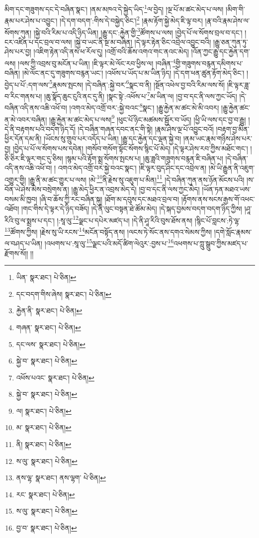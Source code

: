 མིག་དང་གཟུགས་དང་དེ་བཞིན་སྣང་། །ནམ་མཁའ་དེ་སྐྱེད་ཡིད་\footnote{ཡིན་  སྣར་ཐང་།  པེ་ཅིན། }ལ་བྱེད། །ལྔ་པོ་མ་ཚང་མེད་པ་ལས། །མིག་གི་རྣམ་པར་ཤེས་པ་འབྱུང་། །དེ་དག་བདག་:གིས་དེ་བསྐྱེད་ཅིང་།\footnote{དང་བདག་གིས་ཞེས།  སྣར་ཐང་།  པེ་ཅིན། } །རྣམ་རྟོག་སྐྱེ་མེད་ཇི་ལྟ་བར། །རྣ་བའི་རྣམ་ཤེས་ལ་སོགས་ཀུན། །སྐྱེ་བའི་རིམ་པ་འདི་ཉིད་ཡིན། །རྒྱུ་དང་:རྐྱེན་གྱི་\footnote{རྐྱེན་ནི་  སྣར་ཐང་།  པེ་ཅིན། }ཚོགས་པ་ལས། །བྱེད་པོ་ལ་སོགས་བྲལ་བ་དང་། །ངར་འཛིན་པ་དང་བྲལ་བ་ལས། །སྐྱེ་བ་ཡང་ནི་སྔ་མ་བཞིན། །དེ་ལྟར་རྟེན་ཅིང་འབྲེལ་འབྱུང་བའི། །རྒྱུ་ཅན་ཀུན་ཏུ་ཤེས་པར་བྱ། །འཇིག་རྟེན་འདི་ནས་ཕ་རོལ་དུ། །འགྲོ་བའི་ཆོས་འགའ་གང་ནའང་མེད། །འོན་ཀྱང་རྒྱུ་དང་རྐྱེན་དག་ལས། །ལས་ཀྱི་འབྲས་བུ་མངོན་པ་ཡིན། །ཇི་ལྟར་མེ་ལོང་རབ་ཕྱིས་ལ། །བཞིན་\footnote{གཞན་  སྣར་ཐང་།  པེ་ཅིན། }གྱི་གཟུགས་བརྙན་དམིགས་པ་བཞིན། །མེ་ལོང་ནང་དུ་གཟུགས་བརྙན་ཡང་། །འཕོས་པ་ཡོད་པ་མ་ཡིན་ཉིད། །དེ་དག་ཕན་ཚུན་རྟོག་མེད་ཅིང་། །བྱེད་པ་པོ་:དག་ལས་\footnote{དང་ལས་  སྣར་ཐང་།  པེ་ཅིན། }རྣམས་སྤངས། །དེ་བཞིན་:སྐྱེ་བར་\footnote{སྐྱེ་བ་  སྣར་ཐང་།  པེ་ཅིན། }སྣང་བ་ནི། །སྔོན་འཕེལ་བྱ་བའི་རིམ་ལས་སོ། །ཇི་ལྟར་ཟླ་བ་རིང་གནས་པ། །ཆུ་སྣོད་ཆུང་ངུའི་ནང་དུ་ནི། །སྣང་སྟེ་:འཕོས་པ་\footnote{འཕོས་པའང་  སྣར་ཐང་།  པེ་ཅིན། }མ་ཡིན་ལ། །བྱ་བ་དང་ནི་ལས་ཀྱང་ཡོད། །དེ་བཞིན་འདི་ནས་འཆི་འཕོ་བ། །འགའ་མེད་འགྲོ་བར་:སྐྱེ་བའང་\footnote{སྐྱེ་བ་  སྣར་ཐང་།  པེ་ཅིན། }སྣང་། །རྒྱུ་རྐྱེན་མ་ཚང་མེ་མི་འབར། །རྒྱུ་རྐྱེན་ཚང་ན་མེ་འབར་བཞིན། །རྒྱུ་རྐྱེན་མ་ཚང་མེད་པ་ལས།\footnote{ལ།  སྣར་ཐང་།  པེ་ཅིན། } །ཕུང་པོ་ཉིང་མཚམས་སྦྱོར་བ་ཡོད། །ཕྱི་ཡི་ལས་དང་བྱ་བ་རྒྱུ། །དེ་ནི་བརྟགས་པའི་བདག་ཉིད་དོ། །དེ་བཞིན་གཞན་དབང་ནང་གི་སྟེ། །རྣམ་ཤེས་ལྔ་པོ་འབྱུང་བའོ། །བརྟག་བྱ་མིན་ཕྱིར་དོན་དམ་ནི། །ཡོངས་སུ་གྲུབ་པར་འདོད་པ་ཡིན། །རྒྱུ་དང་རྐྱེན་དང་ལྡན་སྐྱེ་བ། །ནམ་ཡང་རྣམ་གཉིས་ཤེས་པར་བྱ། །བྱེད་པ་པོ་ལ་སོགས་པས་དབེན། །གསོབ་གསོག་སྟོང་སོགས་སྙིང་པོ་མེད། །དེ་ལྟར་ཤེས་རབ་ཀྱིས་མཐོང་གང་། །ཅི་ཅིར་ཇི་ལྟར་གང་དུ་ཅིས། །སྙམ་པའི་རྟོག་སྨྲ་སོགས་སྤངས་པ། །ཆུ་ཟླའི་གཟུགས་བརྙན་ཇི་བཞིན་པ། །དེ་བཞིན་འདི་ནས་འཆི་འཕོ་བ། །
འགའ་མེད་འགྲོ་བར་སྐྱེ་བའང་སྣང་། །ཇི་ལྟར་བུད་ཤིང་དང་འབྲེལ་ན། །མེ་ཡི་རྒྱུན་ནི་འཇུག་འགྱུར་གྱི། །རྒྱུ་ནི་མ་ཚང་གྱུར་པ་ལས། །མེ་\footnote{མ་  སྣར་ཐང་།  པེ་ཅིན། }ནི་རྗེས་སུ་འཇུག་པ་མིན།\footnote{ནི།  སྣར་ཐང་།  པེ་ཅིན། } །དེ་བཞིན་ཀུན་ནས་ཉོན་མོངས་པའི། །ས་བོན་ཡེ་ཤེས་མེས་བསྲེགས་ན། །རྒྱུ་མེད་ཕྱིར་ན་འབྲས་མེད་དེ། །བྱ་བ་དང་ནི་ལས་ཀྱང་མེད། །ཡོན་ཏན་མཐའ་ཡས་བསམ་མི་ཁྱབ། །ཞི་བ་ཆོས་ཀྱི་རང་བཞིན་སྐུ། །ཐོག་མ་དབུས་དང་མཐའ་བྲལ་བ། །རྟོགས་ནས་སངས་རྒྱས་གོ་འཕང་འཐོབ། །གང་གིས་དེ་ལྟར་དེ་ཉིད་བཟོད། །དེ་ནི་ལུང་བསྟན་ཐེ་ཚོམ་མེད། །དེ་སྐད་བྱམས་བདག་བདག་ཉིད་ཀྱིས། །ཤཱ་རིའི་བུ་ལ་སྨྲས་པ་དང་། །:སཱ་ལུ་\footnote{ས་ལུ་  སྣར་ཐང་།  པེ་ཅིན། }ལྗང་པ་དཔེར་མཛད་པ། །དེ་ནི་ཤཱ་རིའི་བུས་ཐོས་ནས། །སྙིང་པོ་བླངས་:ཏེ་ལྷ་\footnote{ནས་ལྷ་  སྣར་ཐང་། ནས་ལྷག་  པེ་ཅིན། }ཚོགས་ཀྱིས། །རྗེས་སུ་ཡི་རངས་\footnote{རང་  སྣར་ཐང་།  པེ་ཅིན། }མངོན་བསྟོད་ནས། །ལངས་ཏེ་སོང་ནས་དགའ་སེམས་ཀྱིས། །དགེ་སློང་རྣམས་ལ་བཤད་པ་ཡིན། །འཕགས་པ་:སཱ་ལུ་\footnote{ས་ལུ་  སྣར་ཐང་།  པེ་ཅིན། }ལྗང་པའི་མདོ་ཚིག་ལེའུར་:བྱས་པ་\footnote{བྱ་བ་  སྣར་ཐང་།  པེ་ཅིན། }འཕགས་པ་ཀླུ་སྒྲུབ་ཀྱིས་མཛད་པ་རྫོགས་སོ།། །།